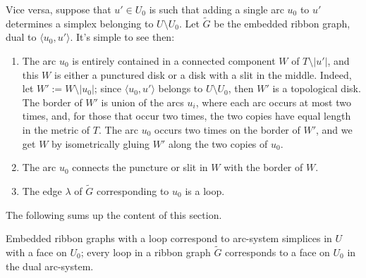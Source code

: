 Vice versa, suppose that $u' \in U_0$ is such that adding a single arc
$u_0$ to $u'$ determines a simplex belonging to $U \setminus U_0$.  Let
$\tilde G$ be the embedded ribbon graph, dual to $\langle u_0, u'\rangle$.  It's
simple to see then:
\begin{enumerate}
\item The arc $u_0$ is entirely contained in a connected component $W$
  of $T \setminus |u'|$, and this $W$ is either a punctured disk or a disk
  with a slit in the middle.  Indeed, let $W' := W \setminus |u_0|$; since
  $\langle u_0, u'\rangle$ belongs to $U \setminus U_0$, then $W'$ is a topological disk.
  The border of $W'$ is union of the arcs $u_i$, where each arc occurs
  at most two times, and, for those that occur two times, the two
  copies have equal length in the metric of $T$.  The arc $u_0$ occurs
  two times on the border of $W'$, and we get $W$ by isometrically
  gluing $W'$ along the two copies of $u_0$. 
\item The arc $u_0$ connects the puncture or slit in $W$ with the
  border of $W$.
\item The edge $\lambda$ of $\tilde G$ corresponding to $u_0$ is a loop.
\end{enumerate}

The following sums up the content of this section.
\begin{lemma}
  \label{lemma:erg-loop}
  Embedded ribbon graphs with a loop correspond to arc-system simplices
  in $U$ with a face on $U_0$; every loop in a ribbon graph $\tilde G$
  corresponds to a face on $U_0$ in the dual arc-system.
\end{lemma}



